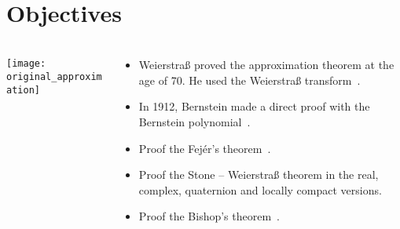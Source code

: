\section{Objectives}

\begin{frame}
	\frametitle{\secname}
	\begin{columns}
		\begin{column}{0.38\textwidth}
			\texttt{[image: original\_approximation]}
		\end{column}
		\begin{column}{0.58\textwidth}
			\begin{itemize}
				\item

				      Weierstraß proved the \alert{approximation theorem} at
				      the age of 70.
				      He used the
				      \alert{Weierstraß transform}~\cite{weierstrass1885,Schep2007}.


				\item

				      In 1912, Bernstein made a direct proof with the
				      \alert{Bernstein polynomial}~\cite{Saha2021}.

				\item

				      Proof the \alert{Fejér's theorem}~\cite{Fejér1903}.

				\item

				      Proof the \alert{Stone – Weierstraß theorem} in the
				      real, complex, quaternion and locally compact versions.

				\item

				      Proof the \alert{Bishop's theorem}~\cite{Rudin1991}.
			\end{itemize}
		\end{column}
	\end{columns}

\end{frame}